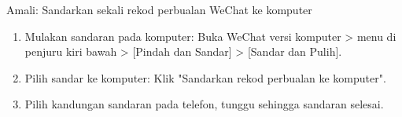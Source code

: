 \begin{tcbpractice}{Amali: Sandarkan sekali rekod perbualan WeChat ke komputer}
\begin{enumerate}
  \item Mulakan sandaran pada komputer: Buka WeChat versi komputer > menu di penjuru kiri bawah > [Pindah dan Sandar] > [Sandar dan Pulih].
  \item Pilih sandar ke komputer: Klik "Sandarkan rekod perbualan ke komputer".
  \item Pilih kandungan sandaran pada telefon, tunggu sehingga sandaran selesai.
\end{enumerate}

\end{tcbpractice}
